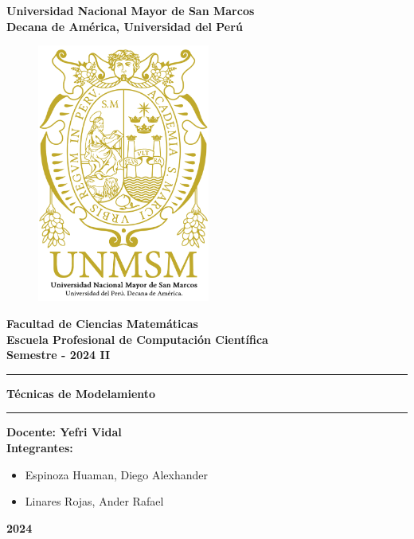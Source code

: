 \begin{titlepage}
  \rmfamily
  \begin{center}
  \LARGE\textbf{Universidad Nacional Mayor de San Marcos}\\
  \vspace{2.5mm}
  \large\textbf{Decana de América, Universidad del Perú}\\
  \vspace{2.5mm}
  \begin{figure}[H]
    \centering
    \includegraphics[height=8.5cm]{src/include/logo.png}
  \end{figure}
  \Large\textbf{Facultad de Ciencias Matemáticas}\\
  \vspace{2.5mm}
  \large\textbf{Escuela Profesional de Computación Científica}\\
  \vspace{2.5mm}
  \large\textbf{Semestre - 2024 II}\\
  \rule{\linewidth}{0.55mm}
  \Large\textbf{Técnicas de Modelamiento}\\
  \rule{\linewidth}{0.55mm}
  \large\textbf{Docente: Yefri Vidal}\\
  \vspace{2.5mm}
  \large\textbf{Integrantes:}\\
  \vspace{2.5mm}
  \begin{itemize}
    \normalsize
    \item Espinoza Huaman, Diego Alexhander
    \item Linares Rojas, Ander Rafael
  \end{itemize}
  \vfill
  {\huge\textbf{2024}}
  \end{center}
\end{titlepage}
